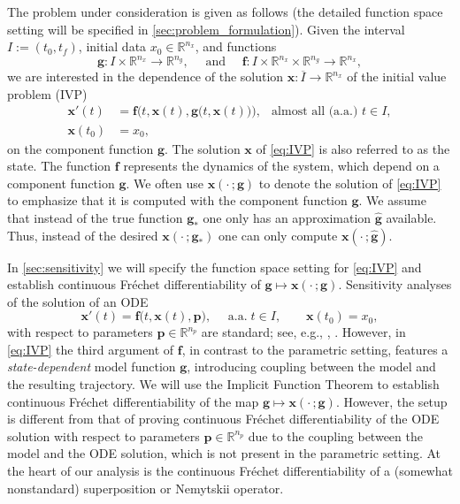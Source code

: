 \documentclass[onefignum,onetabnum]{siamart220329}
\numberwithin{equation}{section}
\newcommand{\aall}{\mbox{ a.a.} \;}
\newcommand {\real} {\mathbb{R}}
\newcommand{\bff}{\ensuremath{\mathbf{f}}} %
\newcommand{\bg}{\ensuremath{\mathbf{g}}} %
\newcommand{\bp}{\ensuremath{\mathbf{p}}} %
\newcommand{\bx}{\ensuremath{\mathbf{x}}} %
\begin{document}
The problem under consideration is given as follows (the detailed function space setting will be specified in 
\cref{sec:problem_formulation}).
Given the interval $I := (t_0, t_f)$, initial data $x_0 \in \real^{n_x}$, and functions
\[
	\bg :  I \times \real^{n_x}  \rightarrow \real^{n_g}, \quad \mbox{ and } \quad
	\bff : I \times  \real^{n_x} \times \real^{n_g} \rightarrow \real^{n_x},
\]
we are interested in the dependence of the solution
$\bx : \overline{I} \rightarrow \real^{n_x}$ of the initial value problem (IVP)
\begin{equation} \label{eq:IVP}
\begin{aligned}
	\bx'(t) &= \bff\Big( t, \bx(t), \bg\big(t, \bx(t) \big) \Big), & \mbox{almost all (a.a.) } t \in I, \\
	\bx(t_0) &= x_0,
\end{aligned}
\end{equation}
on the component function $\bg$. The solution $\bx$ of \eqref{eq:IVP} is also referred to as the state.
The function $\bff$ represents the dynamics of the system, which depend on a component function $\bg$.
We often use $\bx(\cdot \, ; \bg)$ to denote the solution of \eqref{eq:IVP} to emphasize that it is computed
with the component function $\bg$.
We assume that instead of the true function $\bg_*$ one only has an approximation $\widehat{\bg}$ available.
Thus, instead of the desired $\bx(\cdot \, ; \bg_*)$ one can only compute $\bx(\cdot \, ; \widehat{\bg})$.

In \cref{sec:sensitivity} we will specify the function space setting for \eqref{eq:IVP}
and establish continuous Fr\'echet differentiability of $\bg \mapsto \bx(\cdot \, ; \bg)$.
Sensitivity analyses of the solution of an ODE
\begin{equation*}
	\bx'(t) = \bff\big( t, \bx(t), \bp \big), \quad \aall t \in I, \qquad   \bx(t_0) = x_0,
\end{equation*}
with respect to parameters $\bp \in \real^{n_p}$ are standard;
see, e.g., \cite[Sec.~9]{HAmann_1990}, \cite[Sec.~I.14]{EHairer_SONorsett_GWanner_1993a}.
However, in \eqref{eq:IVP} the third argument of $\bff$, in contrast to the parametric setting, features a \emph{state-dependent} model function $\bg$, introducing coupling between the model and the resulting trajectory. We will use the Implicit Function Theorem to establish continuous
Fr\'echet differentiability of the map $\bg \mapsto \bx(\cdot \, ; \bg)$. However, the setup is
different from that of proving continuous Fr\'echet differentiability of the ODE solution with respect to parameters $\bp \in \real^{n_p}$ 
due to the coupling between the model and the ODE solution, which is not present in the parametric setting.
At the heart of our analysis is the continuous Fr\'echet differentiability of a (somewhat nonstandard) superposition or Nemytskii operator.
\end{document}
